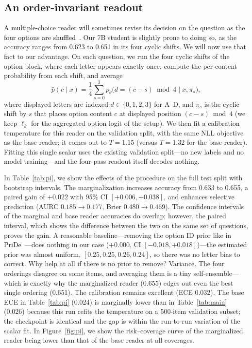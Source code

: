\documentclass[conference]{IEEEtran}
\begin{document}
\subsection{An order-invariant readout}\label{sec:pi}
A multiple-choice reader will sometimes revise its decision on the question as the four options are shuffled~\cite{robustmcq,permbias}. Our 7B student is slightly prone to doing so, as the accuracy ranges from 0.623 to 0.651 in its four cyclic shifts. We will now use that fact to our advantage. On each question, we run the four cyclic shifts of the option block, where each letter appears exactly once, compute the per-content probability from each shift, and average
\begin{equation}
\bar{p}(c\mid x)=\frac{1}{4}\sum_{s=0}^{3}
p_\theta\!\big(d=(c-s)\bmod 4 \;\big|\; x,\pi_s\big),
\end{equation}
where displayed letters are indexed $d\in\{0,1,2,3\}$ for A--D, and $\pi_s$ is the cyclic shift by $s$ that places option content $c$ at displayed position $(c-s)\bmod 4$ (we keep $\ell_k$ for the aggregated option logit of the setup). We then fit a calibration temperature for this reader on the validation split, with the same NLL objective as the base reader; it comes out to $T=1.15$ (versus $T=1.32$ for the base reader). Fitting this single scalar uses the existing validation split---no new labels and no model training---and the four-pass readout itself decodes nothing.

In Table~\ref{tab:pi}, we show the effects of the procedure on the full test split with bootstrap intervals. The marginalization increases accuracy from 0.633 to 0.655, a paired gain of $+0.022$ with 95\% CI $[+0.006,+0.038]$, and enhances selective prediction (AURC $0.185\!\to\!0.177$, Brier $0.480\!\to\!0.469$). The confidence intervals of the marginal and base reader accuracies do overlap; however, the paired interval, which shows the difference between the two on the same set of questions, proves the gain. A reasonable baseline---removing the option ID prior like in PriDe~\cite{robustmcq}---does nothing in our case ($+0.000$, CI $[-0.018,+0.018]$)---the estimated prior was almost uniform, $[0.25,0.25,0.26,0.24]$, so there was no letter bias to correct. Why help at all if there is no prior to remove? Variance. The four orderings disagree on some items, and averaging them is a tiny self-ensemble---which is exactly why the marginalized reader (0.655) edges out even the best single ordering (0.651). The calibration remains excellent (ECE 0.032). The base ECE in Table~\ref{tab:pi} (0.024) is marginally lower than in Table~\ref{tab:main} (0.026) because this run refits the temperature on a 500-item validation subset; the checkpoint is identical and the gap is within the run-to-run variation of the scalar fit. In Figure~\ref{fig:pi}, we show the risk--coverage curve of the marginalized reader being lower than that of the base reader at all coverages.
\end{document}
